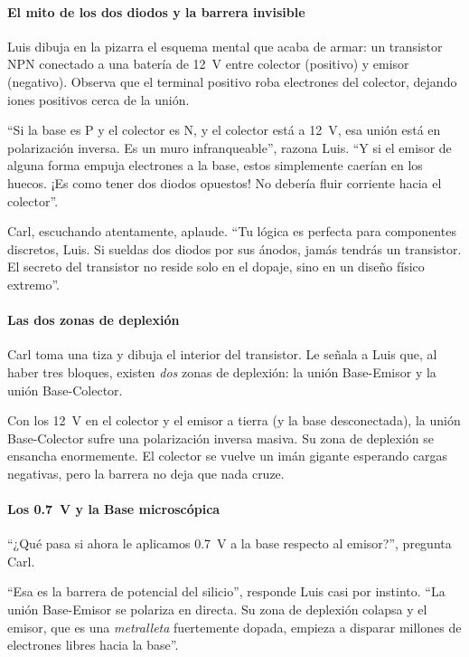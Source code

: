 \paragraph{El mito de los dos diodos y la barrera invisible}
Luis dibuja en la pizarra el esquema mental que acaba de armar: un transistor NPN conectado a una batería de \qty{12}{\volt} entre colector (positivo) y emisor (negativo). Observa que el terminal positivo roba electrones del colector, dejando iones positivos cerca de la unión. 

``Si la base es P y el colector es N, y el colector está a \qty{12}{\volt}, esa unión está en polarización inversa. Es un muro infranqueable'', razona Luis. ``Y si el emisor de alguna forma empuja electrones a la base, estos simplemente caerían en los huecos. ¡Es como tener dos diodos opuestos! No debería fluir corriente hacia el colector''.

Carl, escuchando atentamente, aplaude. ``Tu lógica es perfecta para componentes discretos, Luis. Si sueldas dos diodos por sus ánodos, jamás tendrás un transistor. El secreto del transistor no reside solo en el dopaje, sino en un diseño físico extremo''.

\paragraph{Las dos zonas de deplexión}
Carl toma una tiza y dibuja el interior del transistor. Le señala a Luis que, al haber tres bloques, existen \emph{dos} zonas de deplexión: la unión Base-Emisor y la unión Base-Colector. 


Con los \qty{12}{\volt} en el colector y el emisor a tierra (y la base desconectada), la unión Base-Colector sufre una polarización inversa masiva. Su zona de deplexión se ensancha enormemente. El colector se vuelve un imán gigante esperando cargas negativas, pero la barrera no deja que nada cruze.

\paragraph{Los \qty{0.7}{\volt} y la Base microscópica}
``¿Qué pasa si ahora le aplicamos \qty{0.7}{\volt} a la base respecto al emisor?'', pregunta Carl. 

``Esa es la barrera de potencial del silicio'', responde Luis casi por instinto. ``La unión Base-Emisor se polariza en directa. Su zona de deplexión colapsa y el emisor, que es una \emph{metralleta} fuertemente dopada, empieza a disparar millones de electrones libres hacia la base''.

